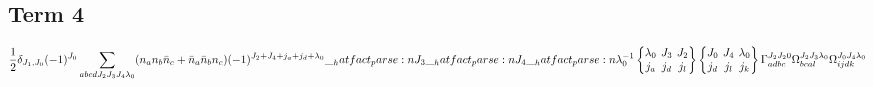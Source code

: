 \documentclass{scrartcl}
\newcommand{\sixj}[6]{\begingroup\setlength{\arraycolsep}{0.2em}\begin{Bmatrix} #1 & #2 & #3 \\ #4 & #5 & #6 \end{Bmatrix}\endgroup}
\begin{document}
\subsection{Term 4}
\begin{dmath*}
\frac{1}{2} \* \delta_{{J}_{1},{J}_{0}} \* (-1)^{{J}_{0}} \* \sum_{a b c d {J}_{2} {J}_{3} {J}_{4} {{\lambda}}_{0}} \* (n_{a} \* n_{b} \* \bar{n}_{c} + \bar{n}_{a} \* \bar{n}_{b} \* n_{c}) \* (-1)^{{J}_{2}+{J}_{4}+{j}_{a}+{j}_{d}+{{\lambda}}_{0}} \* \hatfact{{J}_{3}} \* \hatfact{{J}_{4}} \* \hatfact{{{\lambda}}_{0}^{-1}} \* \sixj{{{\lambda}}_{0}}{{J}_{3}}{{J}_{2}}{{j}_{a}}{{j}_{d}}{{j}_{l}} \* \sixj{{J}_{0}}{{J}_{4}}{{{\lambda}}_{0}}{{j}_{d}}{{j}_{l}}{{j}_{k}} \* \Gamma_{a d b c}^{{J}_{2} {J}_{2} 0} \* \Omega_{b c a l}^{{J}_{2} {J}_{3} {{\lambda}}_{0}} \* \Omega_{i j d k}^{{J}_{0} {J}_{4} {{\lambda}}_{0}}
\end{dmath*}
\end{document}
